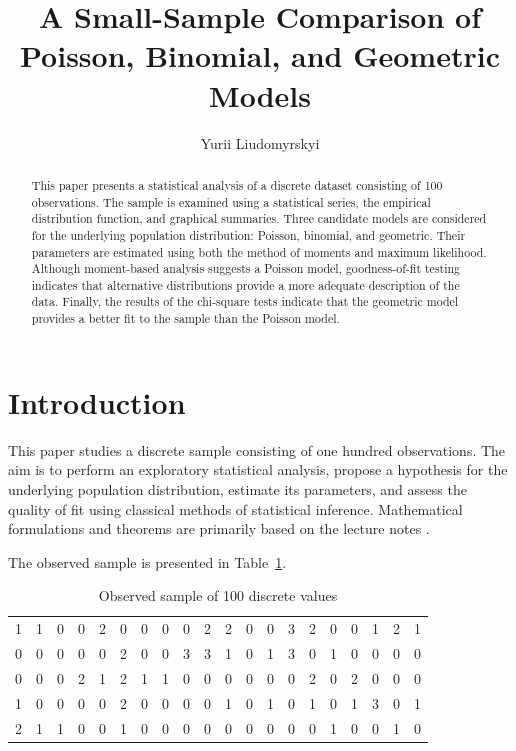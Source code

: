 \documentclass[final,3p,times,onecolumn]{elsarticle}
\begin{document}
\begin{frontmatter}

\title{A Small-Sample Comparison of Poisson, Binomial, and Geometric Models}

\author{Yurii Liudomyrskyi}

\begin{abstract}
This paper presents a statistical analysis of a discrete dataset consisting of 100 observations. 
The sample is examined using a statistical series, the empirical distribution function, and graphical summaries. 
Three candidate models are considered for the underlying population distribution: Poisson, binomial, and geometric. 
Their parameters are estimated using both the method of moments and maximum likelihood. 
Although moment-based analysis suggests a Poisson model, goodness-of-fit testing indicates that alternative distributions provide a more adequate description of the data.
Finally, the results of the chi-square tests indicate that the geometric model provides a better fit to the sample than the Poisson model.
\end{abstract}

\end{frontmatter}
\section{Introduction}

This paper studies a discrete sample consisting of one hundred observations. 
The aim is to perform an exploratory statistical analysis, propose a hypothesis for the underlying population distribution, estimate its parameters, and assess the quality of fit using classical methods of statistical inference. 
Mathematical formulations and theorems are primarily based on the lecture notes \cite{ab}.

The observed sample is presented in Table~\ref{tab:sample}. 

\begin{table}[h!]
\centering
\caption{Observed sample of 100 discrete values}
\label{tab:sample}
\begin{tabular}{cccccccccccccccccccc}
1 & 1 & 0 & 0 & 2 & 0 & 0 & 0 & 0 & 2 & 2 & 0 & 0 & 3 & 2 & 0 & 0 & 1 & 2 & 1 \\
0 & 0 & 0 & 0 & 0 & 2 & 0 & 0 & 3 & 3 & 1 & 0 & 1 & 3 & 0 & 1 & 0 & 0 & 0 & 0 \\
0 & 0 & 0 & 2 & 1 & 2 & 1 & 1 & 0 & 0 & 0 & 0 & 0 & 0 & 2 & 0 & 2 & 0 & 0 & 0 \\
1 & 0 & 0 & 0 & 0 & 2 & 0 & 0 & 0 & 0 & 1 & 0 & 1 & 0 & 1 & 0 & 1 & 3 & 0 & 1 \\
2 & 1 & 1 & 0 & 0 & 1 & 0 & 0 & 0 & 0 & 0 & 0 & 0 & 0 & 0 & 1 & 0 & 0 & 1 & 0
\end{tabular}
\end{table}
\end{document}
